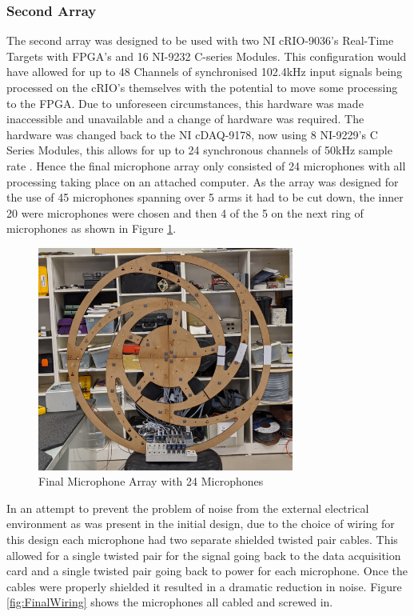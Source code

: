 \documentclass{UoNMCHA}
\numberwithin{equation}{section}
\begin{document}
\subsubsection{Second Array} \label{sec:Second Design DAQ}
    The second array was designed to be used with two NI cRIO-9036's Real-Time Targets with FPGA's and 16 NI-9232 C-series Modules. This configuration would have allowed for up to 48 Channels of synchronised 102.4kHz input signals being processed on the cRIO's themselves with the potential to move some processing to the FPGA. Due to unforeseen circumstances, this hardware was made inaccessible and unavailable and a change of hardware was required. The hardware was changed back to the NI cDAQ-9178, now using 8 NI-9229's C Series Modules, this allows for up to 24 synchronous channels of 50kHz sample rate \citep{NI9229}. Hence the final microphone array only consisted of 24 microphones with all processing taking place on an attached computer. As the array was designed for the use of 45 microphones spanning over 5 arms it had to be cut down, the inner 20 were microphones were chosen and then 4 of the 5 on the next ring of microphones as shown in Figure \ref{fig:FinalBuild}.
    
    \begin{figure} [H]
        \centering
        \includegraphics[keepaspectratio, width = 0.75\textwidth]{Figures/FinalArrayBuilt.png}
        \caption{Final Microphone Array with 24 Microphones}
        \label{fig:FinalBuild}
    \end{figure}

    In an attempt to prevent the problem of noise from the external electrical environment as was present in the initial design, due to the choice of wiring for this design each microphone had two separate shielded twisted pair cables. This allowed for a single twisted pair for the signal going back to the data acquisition card and a single twisted pair going back to power for each microphone. Once the cables were properly shielded it resulted in a dramatic reduction in noise. Figure \ref{fig:FinalWiring} shows the microphones all cabled and screwed in. 
\end{document}
